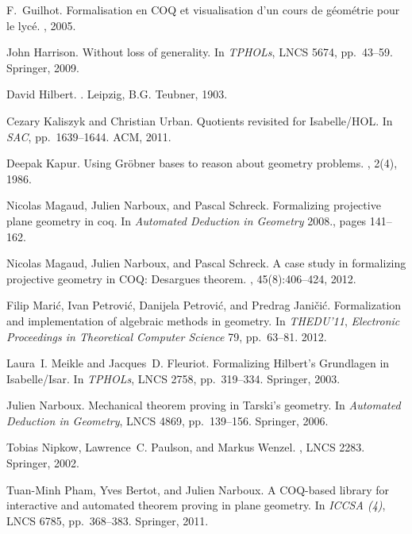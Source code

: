 \begin{thebibliography}{10}
F.~Guilhot.
\newblock Formalisation en COQ et visualisation d’un cours de g\'eom\'etrie
  pour le lyc\'e.
, 2005.


John Harrison.
\newblock Without loss of generality.
\newblock In {\em TPHOLs}, LNCS 5674, pp.~43--59. Springer, 2009.

David Hilbert.
.
\newblock Leipzig, B.G. Teubner, 1903.

Cezary Kaliszyk and Christian Urban.
\newblock Quotients revisited for Isabelle/HOL.
\newblock In {\em SAC}, pp.~1639--1644. ACM, 2011.

Deepak Kapur.
\newblock Using Gr\"obner bases to reason about geometry problems.
, 2(4), 1986.

Nicolas Magaud, Julien Narboux, and Pascal Schreck.
\newblock Formalizing projective plane geometry in coq.
\newblock In {\em Automated Deduction in Geometry} 2008., pages 141--162.

Nicolas Magaud, Julien Narboux, and Pascal Schreck.
\newblock A case study in formalizing projective geometry in COQ: Desargues
  theorem.
, 45(8):406--424, 2012.

Filip Mari\'c, Ivan Petrovi\'c, Danijela Petrovi\'c, and Predrag Jani\v{c}i\'c.
\newblock Formalization and implementation of algebraic methods in geometry.
\newblock In {\em THEDU'11}, {\em Electronic Proceedings in Theoretical Computer Science} 79, pp.~63--81. 2012.

Laura~I. Meikle and Jacques~D. Fleuriot.
\newblock Formalizing Hilbert's Grundlagen in Isabelle/Isar.
\newblock In {\em TPHOLs}, LNCS 2758, pp.~319--334. Springer, 2003.

Julien Narboux.
\newblock Mechanical theorem proving in Tarski's geometry.
\newblock In {\em Automated Deduction in Geometry}, LNCS 4869, pp.~139--156. Springer, 2006.

Tobias Nipkow, Lawrence~C. Paulson, and Markus Wenzel.
, LNCS 2283.
\newblock Springer, 2002.

Tuan-Minh Pham, Yves Bertot, and Julien Narboux.
\newblock A COQ-based library for interactive and automated theorem proving in
  plane geometry.
\newblock In {\em ICCSA (4)}, LNCS 6785, pp.~368--383. Springer, 2011.


\end{thebibliography}
